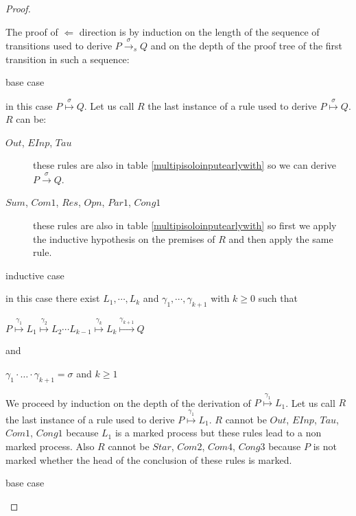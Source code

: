 \begin{proposition}
\begin{proof}
\begin{description}
    \end{description}
    
    
    The proof of $\Leftarrow$ direction is by induction on the length of the sequence of transitions used to derive $P\xrightarrow{\sigma}_{s} Q$ and on the depth of the proof tree of the first transition in such a sequence:
    \begin{description}
      \item[base case]
    \end{description}
	in this case $P\stackrel{\sigma}{\longmapsto} Q$. Let us call $R$ the last instance of a rule used to derive $P\stackrel{\sigma}{\longmapsto} Q$. $R$ can be: 
	\begin{description}
	  \item[$Out$, $EInp$, $Tau$] these rules are also in table \ref{multipisoloinputearlywith} so we can derive $P\xrightarrow{\sigma} Q$.
	  \item[$Sum$, $Com1$, $Res$, $Opn$, $Par1$, $Cong1$] these rules are also in table \ref{multipisoloinputearlywith} so first we apply the inductive hypothesis on the premises of $R$ and then apply the same rule.
	\end{description}
    \begin{description}
      \item[inductive case]
    \end{description}
	in this case there exist $L_{1}, \cdots, L_{k}$ and $\gamma_{1}, \cdots, \gamma_{k+1}$ with $k\geq 0$ such that 
	\begin{center}
	  $P \stackrel{\gamma_{1}}{\longmapsto} L_{1}  \stackrel{\gamma_{2}}{\longmapsto} L_{2} \cdots L_{k-1} \stackrel{\gamma_{k}}{\longmapsto} L_{k} \stackrel{\gamma_{k+1}}{\longmapsto} Q$ 
	\end{center}
	and 
	\begin{center}
	  $\gamma_{1} \cdot \ldots \cdot \gamma_{k+1} = \sigma$ and $k\geq 1$
	\end{center}
	We proceed by induction on the depth of the derivation of $P \stackrel{\gamma_{1}}{\longmapsto} L_{1}$. Let us call $R$ the last instance of a rule used to derive $P\stackrel{\gamma_{1}}{\longmapsto} L_{1}$. $R$ cannot be $Out$, $EInp$, $Tau$, $Com1$, $Cong1$ because $L_{1}$ is a marked process but these rules lead to a non marked process. Also $R$ cannot be $Star$, $Com2$, $Com4$, $Cong3$ because $P$ is not marked whether the head of the conclusion of these rules is marked.
	\begin{description}
	  \item[base case] 

\end{description}
\end{proof}
\end{proposition}
